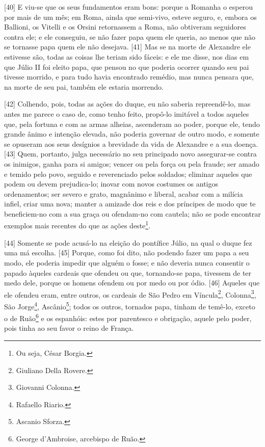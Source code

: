 {[}40{]} E viu-se que os seus fundamentos eram bons: porque a Romanha o
esperou por mais de um mês; em Roma, ainda que semi-vivo, esteve seguro,
e, embora os Ballioni, os Vitelli e os Orsini retornassem a Roma, não
obtiveram seguidores contra ele; e ele conseguiu, se não fazer papa quem
ele queria, ao menos que não se tornasse papa quem ele não desejava.
{[}41{]} Mas se na morte de Alexandre ele estivesse são, todas as coisas
lhe teriam sido fáceis: e ele me disse, nos dias em que Júlio II foi
eleito papa, que pensou no que poderia ocorrer quando seu pai tivesse
morrido, e para tudo havia encontrado remédio, mas nunca pensara que, na
morte de seu pai, também ele estaria morrendo.

{[}42{]} Colhendo, pois, todas as ações do duque, eu não saberia
repreendê-lo, mas antes me parece o caso de, como tenho feito, propô-lo
imitável a todos aqueles que, pela fortuna e com as armas alheias,
ascenderam ao poder, porque ele, tendo grande ânimo e intenção elevada,
não poderia governar de outro modo, e somente se opuseram aos seus
desígnios a brevidade da vida de Alexandre e a sua doença. {[}43{]}
Quem, portanto, julga necessário no seu principado novo assegurar-se
contra os inimigos, ganha para si amigos; vencer ou pela força ou pela
fraude; ser amado e temido pelo povo, seguido e reverenciado pelos
soldados; eliminar aqueles que podem ou devem prejudica-lo; inovar com
novos costumes os antigos ordenamentos; ser severo e grato, magnânimo e
liberal, acabar com a milícia infiel, criar uma nova; manter a amizade
dos reis e dos príncipes de modo que te beneficiem-no com a sua graça ou
ofendam-no com cautela; não se pode encontrar exemplos mais recentes do
que as ações deste\footnote{Ou seja, César Borgia.}.

{[}44{]} Somente se pode acusá-lo na eleição do pontífice Júlio, na qual
o duque fez uma má escolha. {[}45{]} Porque, como foi dito, não podendo
fazer um papa a seu modo, ele poderia impedir que alguém o fosse; e não
deveria nunca consentir o papado àqueles cardeais que ofendeu ou que,
tornando-se papa, tivessem de ter medo dele, porque os homens ofendem ou
por medo ou por ódio. {[}46{]} Aqueles que ele ofendeu eram, entre
outros, os cardeais de São Pedro em Víncula\footnote{Giuliano Della
  Rovere.}, Colonna\footnote{Giovanni Colonna.}, São Jorge\footnote{Rafaello
  Riario.}, Ascânio\footnote{Ascanio Sforza.}; todos os outros, tornados
papa, tinham de temê-lo, exceto o de Ruão\footnote{George d'Ambroise,
  arcebispo de Ruão.} e os espanhóis: estes por parentesco e obrigação,
aquele pelo poder, pois tinha ao seu favor o reino de França.

